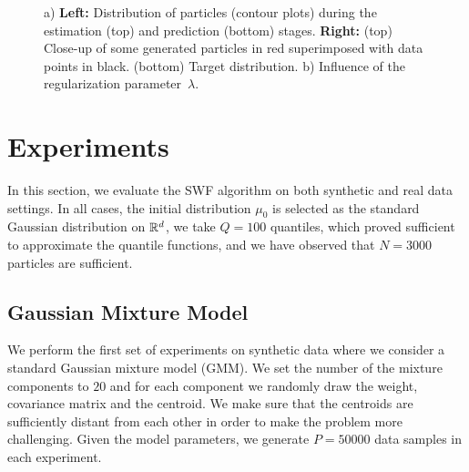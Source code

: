 
\begin{figure*}
 \hspace{30pt}
\caption{a) \textbf{Left:} Distribution of particles (contour plots) during the estimation (top) and prediction (bottom) stages. \textbf{Right:} (top) Close-up of some generated particles in red superimposed with data points in black. (bottom) Target distribution. b) Influence of the regularization parameter~$\lambda$. }
\end{figure*}

\section{Experiments}



%
In this section, we evaluate the SWF algorithm on both synthetic and real data settings. In all cases, the initial distribution $\mu_0$ is selected as the standard Gaussian distribution on $\mathbb{R}^d$, we take $Q=100$ quantiles, which proved sufficient to approximate the quantile functions, and we have observed that $N=3000$ particles are sufficient. %



\subsection{Gaussian Mixture Model }
We perform the first set of experiments on synthetic data where we consider a standard Gaussian mixture model (GMM).
%
We set the number of the mixture components to $20$ and for each component we randomly draw the weight, covariance matrix and the centroid. We make sure that the centroids are sufficiently distant from each other in order to make the problem more challenging. Given the model parameters, we generate $P=50000$ data samples in each experiment.


